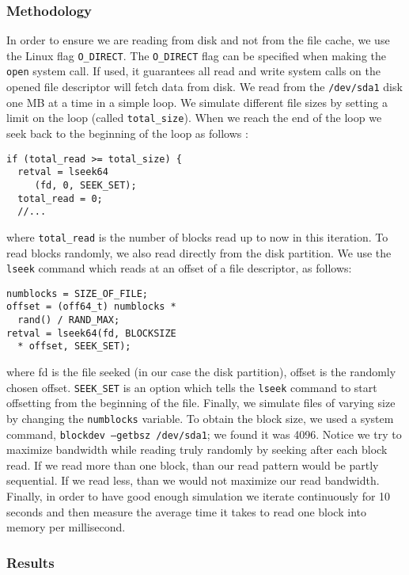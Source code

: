 \subsubsection{Methodology}

In order to ensure we are reading from disk and not from the file cache, we use the Linux flag \texttt{O\_DIRECT}. The \texttt{O\_DIRECT} flag can be specified when making the \texttt{open} system call. If used, it guarantees all read and write system calls on the opened file descriptor will fetch data from disk. We read from the \texttt{/dev/sda1} disk one MB at a time in a simple loop. We simulate different file sizes by setting a limit on the loop (called \texttt{total\_size}). When we reach the end of the loop we seek back to the beginning of the loop as follows : 

\begin{lstlisting}
if (total_read >= total_size) {
  retval = lseek64
     (fd, 0, SEEK_SET);
  total_read = 0;
  //...
\end{lstlisting}

where \texttt{total\_read} is the number of blocks read up to now in this iteration. To read blocks randomly, we also read directly from the disk partition. We use the \texttt{lseek} command which reads at an offset of a file descriptor, as follows:

\begin{lstlisting}
numblocks = SIZE_OF_FILE;
offset = (off64_t) numblocks *
  rand() / RAND_MAX;
retval = lseek64(fd, BLOCKSIZE 
  * offset, SEEK_SET);
\end{lstlisting}

where fd is the file seeked (in our case the disk partition), offset is the randomly chosen offset. \texttt{SEEK\_SET} is an option which tells the \texttt{lseek} command to start offsetting from the beginning of the file. Finally, we simulate files of varying size by changing the \texttt{numblocks} variable. To obtain the block size, we used a system command, \texttt{blockdev --getbsz /dev/sda1}; we found it was 4096. Notice we try to maximize bandwidth while reading truly randomly by seeking after each block read. If we read more than one block, than our read pattern would be partly sequential. If we read less, than we would not maximize our read bandwidth. Finally, in order to have good enough simulation we iterate continuously for 10 seconds and then measure the average time it takes to read one block into memory per millisecond.

\subsubsection{Results}


